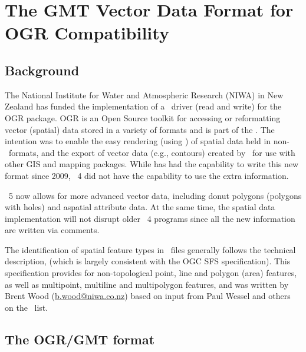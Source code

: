 %
%

\chapter{The GMT Vector Data Format for OGR Compatibility}
\label{app:Q}
\thispagestyle{headings}

\section{Background}
The National Institute for Water and Atmospheric Research (NIWA) in
New Zealand has funded the implementation of a \GMT\ driver (read and
write) for the OGR package. OGR is an Open Source toolkit for accessing
or reformatting vector (spatial) data stored in a variety of formats and
is part of the .
The intention was to enable the easy rendering (using \GMT) of spatial
data held in non-\GMT\ formats, and the export of vector data (e.g.,
contours) created by \GMT\ for use with other GIS and mapping packages.
While  has had the capability to write this new format
since 2009, \GMT\ 4 did not have the capability to use the extra information.

\GMT\ 5 now allows for more advanced vector data, including donut
polygons (polygons with holes) and aspatial attribute data. At the
same time, the spatial data implementation will not disrupt older
\GMT\ 4 programs since all the new information are written via comments.

The identification of spatial feature types in \GMT\ files generally follows the
technical description, (which is largely consistent with the OGC SFS specification).
This specification provides for non-topological point, line and polygon (area)
features, as well as multipoint, multiline and multipolygon features, and was written
by Brent Wood (\href{mailto:b.wood@niwa.co.nz}{b.wood@niwa.co.nz}) based on input
from Paul Wessel and others on the \GMT\ list.

\section{The OGR/GMT format}


